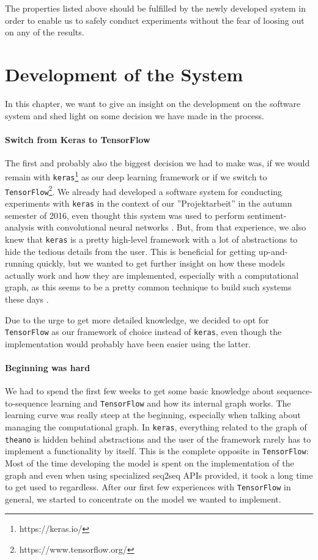 The properties listed above should be fulfilled by the newly developed system in order to enable us to safely conduct experiments without the fear of loosing out on any of the results.

\section{Development of the System}
In this chapter, we want to give an insight on the development on the software system and shed light on some decision we have made in the process.

\paragraph{Switch from Keras to TensorFlow} The first and probably also the biggest decision we had to make was, if we would remain with \texttt{keras}\footnote{https://keras.io/} as our deep learning framework or if we switch to \texttt{TensorFlow}\footnote{https://www.tensorflow.org/}. We already had developed a software system for conducting experiments with \texttt{keras} in the context of our ''Projektarbeit'' in the autumn semester of 2016, even thought this system was used to perform sentiment-analysis with convolutional neural networks \cite{Vongruenigen:2017}. But, from that experience, we also knew that \texttt{keras} is a pretty high-level framework with a lot of abstractions to hide the tedious details from the user. This is beneficial for getting up-and-running quickly, but we wanted to get further insight on how these models actually work and how they are implemented, especially with a computational graph, as this seems to be a pretty common technique to build such systems these days \cite{TensorFlow:2015}\cite{Theano:2016}\cite{Torch:2011}.

Due to the urge to get more detailed knowledge, we decided to opt for \texttt{TensorFlow} as our framework of choice instead of \texttt{keras}, even though the implementation would probably have been easier using the latter.
\paragraph{Beginning was hard} We had to spend the first few weeks to get some basic knowledge about sequence-to-sequence learning and \texttt{TensorFlow} and how its internal graph works. The learning curve was really steep at the beginning, especially when talking about managing the computational graph. In \texttt{keras}, everything related to the graph of \texttt{theano} is hidden behind abstractions and the user of the framework rarely has to implement a functionality by itself. This is the complete opposite in \texttt{TensorFlow}: Most of the time developing the model is spent on the implementation of the graph and even when using specialized seq2seq APIs provided, it took a long time to get used to regardless. After our first few experiences with \texttt{TensorFlow} in general, we started to concentrate on the model we wanted to implement.


